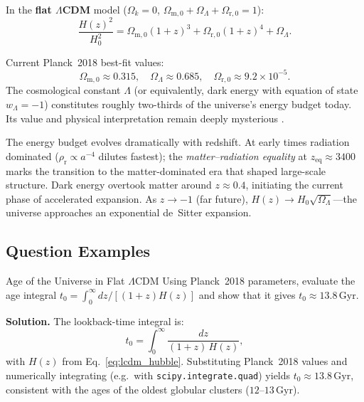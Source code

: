 \begin{theory}
In the \textbf{flat $\Lambda$CDM} model ($\Omega_k=0$,
$\Omega_\mathrm{m,0}+\Omega_{\Lambda}+\Omega_\mathrm{r,0}=1$):
\begin{equation}
  \frac{H(z)^2}{H_0^2}
    = \Omega_{\mathrm{m},0}(1+z)^3
    + \Omega_{\mathrm{r},0}(1+z)^4
    + \Omega_\Lambda.
  \label{eq:lcdm_hubble}
\end{equation}

Current Planck~2018 best-fit values:
\begin{equation*}
  \Omega_\mathrm{m,0} \approx 0.315, \quad
  \Omega_\Lambda \approx 0.685, \quad
  \Omega_\mathrm{r,0} \approx 9.2 \times 10^{-5}.
\end{equation*}
The cosmological constant $\Lambda$ (or equivalently, dark energy with equation of state
$w_\Lambda = -1$) constitutes roughly two-thirds of the universe's energy budget today.
Its value and physical interpretation remain deeply mysterious \citep{Carmeli_2001}.

The energy budget evolves dramatically with redshift.
At early times radiation dominated ($\rho_\mathrm{r}\propto a^{-4}$ dilutes fastest);
the \emph{matter--radiation equality} at $z_\mathrm{eq}\approx3400$ marks the transition
to the matter-dominated era that shaped large-scale structure.
Dark energy overtook matter around $z\approx0.4$, initiating the current
phase of accelerated expansion.
As $z\to-1$ (far future), $H(z)\to H_0\sqrt{\Omega_\Lambda}$—the universe
approaches an exponential de~Sitter expansion.
\end{theory}

\subsection{Question Examples}

\begin{example}{Age of the Universe in Flat $\Lambda$CDM}{}
Using Planck~2018 parameters, evaluate the age integral
$t_0 = \int_0^\infty dz/[(1+z)H(z)]$
and show that it gives $t_0 \approx 13.8\,\mathrm{Gyr}$.

\medskip\textbf{Solution.}\quad
The lookback-time integral is:
\begin{equation}
  t_0 = \int_0^\infty \frac{dz}{(1+z)\,H(z)},
\end{equation}
with $H(z)$ from Eq.~\eqref{eq:lcdm_hubble}.
Substituting Planck~2018 values and numerically integrating (e.g.\ with
\texttt{scipy.integrate.quad}) yields $t_0 \approx 13.8\,\mathrm{Gyr}$,
consistent with the ages of the oldest globular clusters ($12$--$13\,\mathrm{Gyr}$).
\end{example}

